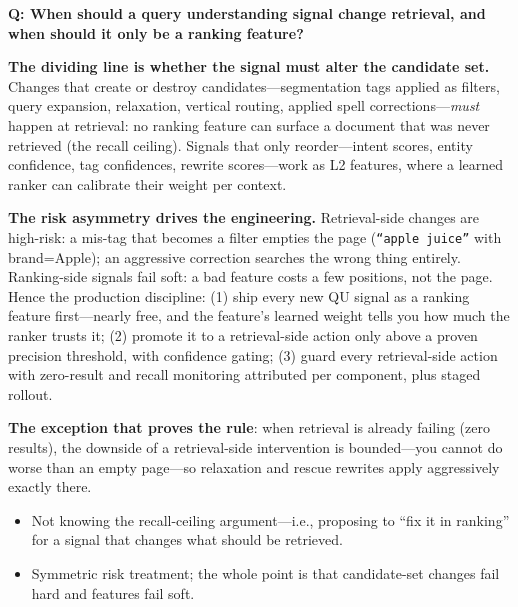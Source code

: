 \begin{interviewq}
\textbf{Q: When should a query understanding signal change retrieval, and when should it only be a ranking feature?}

 \quad {} \quad \badgefreq{\freqmed}

\stronganswer

\textbf{The dividing line is whether the signal must alter the candidate set.} Changes that create or destroy candidates---segmentation tags applied as filters, query expansion, relaxation, vertical routing, applied spell corrections---\textit{must} happen at retrieval: no ranking feature can surface a document that was never retrieved (the recall ceiling). Signals that only reorder---intent scores, entity confidence, tag confidences, rewrite scores---work as L2 features, where a learned ranker can calibrate their weight per context.

\textbf{The risk asymmetry drives the engineering.} Retrieval-side changes are high-risk: a mis-tag that becomes a filter empties the page (\texttt{``apple juice''} with brand=Apple); an aggressive correction searches the wrong thing entirely. Ranking-side signals fail soft: a bad feature costs a few positions, not the page. Hence the production discipline: (1) ship every new QU signal as a ranking feature first---nearly free, and the feature's learned weight tells you how much the ranker trusts it; (2) promote it to a retrieval-side action only above a proven precision threshold, with confidence gating; (3) guard every retrieval-side action with zero-result and recall monitoring attributed per component, plus staged rollout.

\textbf{The exception that proves the rule}: when retrieval is already failing (zero results), the downside of a retrieval-side intervention is bounded---you cannot do worse than an empty page---so relaxation and rescue rewrites apply aggressively exactly there.

\redflags
\begin{itemize}
    \item Not knowing the recall-ceiling argument---i.e., proposing to ``fix it in ranking'' for a signal that changes what should be retrieved.
    \item Symmetric risk treatment; the whole point is that candidate-set changes fail hard and features fail soft.
\end{itemize}



\end{interviewq}
